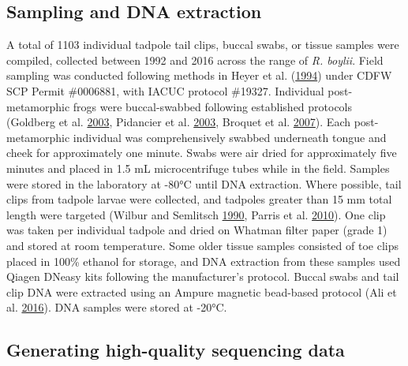 \documentclass[proquest,12pt,final]{ucthesis-CA2012} %
\begin{document}
\begin{ucmainmatter}
\hypertarget{sampling-and-dna-extraction}{%
\subsection{Sampling and DNA
extraction}\label{sampling-and-dna-extraction}}

A total of 1103 individual tadpole tail clips, buccal swabs, or tissue
samples were compiled, collected between 1992 and 2016 across the range
of \emph{R. boylii}. Field sampling was conducted following methods in
Heyer et al. (\protect\hyperlink{ref-heyer_measuring_1994}{1994}) under
CDFW SCP Permit \#0006881, with IACUC protocol \#19327. Individual
post-metamorphic frogs were buccal-swabbed following established
protocols (Goldberg et al.
\protect\hyperlink{ref-goldberg_frogs_2003}{2003}, Pidancier et al.
\protect\hyperlink{ref-pidancier_buccal_2003}{2003}, Broquet et al.
\protect\hyperlink{ref-broquet_buccal_2007}{2007}). Each
post-metamorphic individual was comprehensively swabbed underneath
tongue and cheek for approximately one minute. Swabs were air dried for
approximately five minutes and placed in 1.5 mL microcentrifuge tubes
while in the field. Samples were stored in the laboratory at -80°C until
DNA extraction. Where possible, tail clips from tadpole larvae were
collected, and tadpoles greater than 15 mm total length were targeted
(Wilbur and Semlitsch
\protect\hyperlink{ref-wilbur_ecological_1990}{1990}, Parris et al.
\protect\hyperlink{ref-parris_assessing_2010}{2010}). One clip was taken
per individual tadpole and dried on Whatman filter paper (grade 1) and
stored at room temperature. Some older tissue samples consisted of toe
clips placed in 100\% ethanol for storage, and DNA extraction from these
samples used Qiagen DNeasy kits following the manufacturer's protocol.
Buccal swabs and tail clip DNA were extracted using an Ampure magnetic
bead-based protocol (Ali et al.
\protect\hyperlink{ref-ali_rad_2016}{2016}). DNA samples were stored at
-20°C.

\hypertarget{ch3rapture}{%
\subsection{Generating high-quality sequencing data}\label{ch3rapture}}


\end{ucmainmatter}
\end{document}
